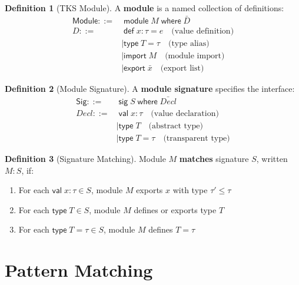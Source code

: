 \documentclass[11pt,twoside,openright]{book}
\theoremstyle{definition}
\newtheorem{definition}{Definition}[chapter]
\theoremstyle{plain}
\theoremstyle{remark}
\begin{document}
\begin{definition}[TKS Module]
\label{def:tks-module}
A \textbf{module} is a named collection of definitions:
\begin{align}
\mathsf{Module} ::=&\; \mathsf{module}\; M\; \mathsf{where}\; \bar{D} \\
D ::=&\; \mathsf{def}\; x : \tau = e \quad \text{(value definition)} \\
    &\mid \mathsf{type}\; T = \tau \quad \text{(type alias)} \\
    &\mid \mathsf{import}\; M \quad \text{(module import)} \\
    &\mid \mathsf{export}\; \bar{x} \quad \text{(export list)}
\end{align}
\end{definition}

\begin{definition}[Module Signature]
\label{def:module-sig}
A \textbf{module signature} specifies the interface:
\begin{align}
\mathsf{Sig} ::=&\; \mathsf{sig}\; S\; \mathsf{where}\; \bar{Decl} \\
Decl ::=&\; \mathsf{val}\; x : \tau \quad \text{(value declaration)} \\
    &\mid \mathsf{type}\; T \quad \text{(abstract type)} \\
    &\mid \mathsf{type}\; T = \tau \quad \text{(transparent type)}
\end{align}
\end{definition}

\begin{definition}[Signature Matching]
\label{def:sig-match}
Module $M$ \textbf{matches} signature $S$, written $M : S$, if:
\begin{enumerate}
  \item For each $\mathsf{val}\; x : \tau \in S$, module $M$ exports $x$ with type $\tau' \leq \tau$
  \item For each $\mathsf{type}\; T \in S$, module $M$ defines or exports type $T$
  \item For each $\mathsf{type}\; T = \tau \in S$, module $M$ defines $T = \tau$
\end{enumerate}
\end{definition}

\section{Pattern Matching}
\end{document}
